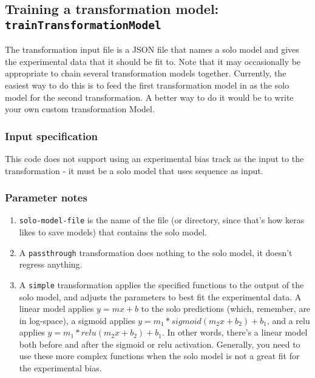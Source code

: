 \documentclass{article}
\begin{document}
\newpage

\subsection{Training a transformation model: \texttt{trainTransformationModel}}\label{prog:trainTransformationModel}

The transformation input file is a JSON file that names a solo model and gives the experimental
data that it should be fit to.
Note that it may occasionally be appropriate to chain several transformation models together.
Currently, the easiest way to do this is to feed the first transformation model in as the solo
model for the second transformation. A better way to do it would be to write your own custom
transformation Model.

\subsubsection{Input specification}


This code does not support using an experimental bias track as the input to the
transformation - it must be a solo model that uses sequence as input.

\subsubsection{Parameter notes}

\begin{enumerate}
    \item \texttt{solo-model-file} is the name of the file (or directory, since that's how keras
        likes to save models) that contains the solo model.
    \item A \texttt{passthrough} transformation does nothing to the solo model, it doesn't
        regress anything.
    \item A \texttt{simple} transformation applies the specified functions to the output of the
        solo model, and adjusts the parameters to best fit the experimental data.
        A linear model applies $y=m x+b$ to the solo predictions (which, remember, are in
        log-space),
        a sigmoid applies $y = m_1 *sigmoid(m_2x+b_2) + b_1$,
        and a relu applies $y = m_1 * relu(m_2x+b_2) + b_1$.
        In other words, there's a linear model both before and after the sigmoid or relu
        activation.
        Generally, you need to use these more complex functions when the solo model is not a
        great fit for the experimental bias.
\end{enumerate}
\end{document}
